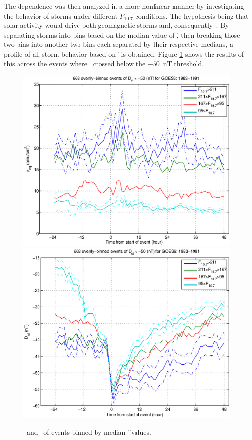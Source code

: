 The dependence was then analyzed in a more nonlinear manner by investigating the behavior of storms under different $F_{10.7}$ conditions. The hypothesis being that solar activity would drive both geomagnetic storms and, consequently, \req. By separating storms into bins based on the median value of \f, then breaking those two bins into another two bins each separated by their respective medians, a profile of all storm behavior based on \f\ is obtained. Figure \ref{fig:HighLowF107rhoeq} shows the results of this across the events where \dst\ crossed below the $-50$~nT threshold. 

\begin{figure}[htp!]
	\centering
	\includegraphics[width=0.7\linewidth]{Figures/HighLowF107rhoeq-Dst50-GOES6-1983-1991}
	\includegraphics[width=0.7\linewidth]{Figures/HighLowF107Dst-Dst50-GOES6-1983-1991}	
	\caption{\req\ and \dst\ of events binned by median \f\ values. }
	\label{fig:HighLowF107rhoeq}
\end{figure}

